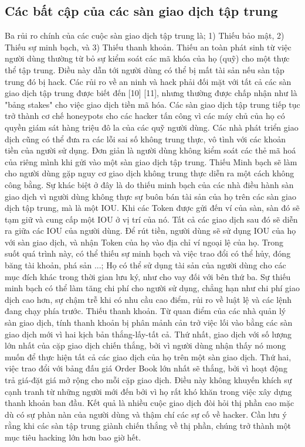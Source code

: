 \documentclass[12pt,a4paper]{article}
\begin{document}
\begin{multicols}{2}
\subsection{Các bất cập của các sàn giao dịch tập trung}
Ba rủi ro chính của các cuộc sàn giao dịch tập trung là; 1) Thiếu bảo mật, 2) Thiếu sự minh bạch, và 3) Thiếu thanh khoản.
Thiếu an toàn phát sinh từ việc người dùng thường từ bỏ sự kiểm soát các mã khóa của họ (quỹ) cho một thực thể tập trung. Điều này dẫn tới người dùng có thể bị mất tài sản nếu sàn tập trung đó bị hack. Các rủi ro về an ninh và hack phải đối mặt với tất cả các sàn giao dịch tập trung được biết đến [10] [11], nhưng thường được chấp nhận như là "bảng stakes" cho việc giao dịch tiền mã hóa. Các sàn giao dịch tập trung tiếp tục trở thành cơ chế honeypots cho các hacker tấn công vì các máy chủ của họ có quyền giám sát hàng triệu đô la của các quỹ người dùng. Các nhà phát triển giao dịch cũng có thể đưa ra các lỗi sai số không trung thực, vô tình với các khoản tiền của người sử dụng. Đơn giản là người dùng không kiểm soát các thẻ mã hoá của riêng mình khi gửi vào một sàn giao dịch tập trung.
Thiếu Minh bạch sẽ làm cho người dùng gặp nguy cơ giao dịch không trung thực diễn ra một cách không công bằng. Sự khác biệt ở đây là do thiếu minh bạch của các nhà điều hành sàn giao dịch vì người dùng không thực sự buôn bán tài sản của họ trên các sàn giao dịch tập trung, mà là một IOU. Khi các Token được gửi đến ví của sàn, sàn đó sẽ tạm giữ và cung cấp một IOU ở vị trí của nó. Tất cả các giao dịch sau đó sẽ diễn ra giữa các IOU của người dùng. Để rút tiền, người dùng sẽ sử dụng IOU của họ với sàn giao dịch, và nhận Token của họ vào địa chỉ ví ngoại lệ của họ. Trong suốt quá trình này, có thể thiếu sự minh bạch và việc trao đổi có thể hủy, đóng băng tài khoản, phá sản ...; Họ có thể sử dụng tài sản của người dùng cho các mục đích khác trong thời gian lưu ký, như cho vay đối với bên thứ ba. Sự thiếu minh bạch có thể làm tăng chi phí cho người sử dụng, chẳng hạn như chi phí giao dịch cao hơn, sự chậm trễ khi có nhu cầu cao điểm, rủi ro về luật lệ và các lệnh đang chạy phía trước.
Thiếu thanh khoản. Từ quan điểm của các nhà quản lý sàn giao dịch, tính thanh khoản bị phân mảnh cản trở việc lối vào bằng các sàn giao dịch mới vì hai kịch bản thắng-lấy-tất cả. Thứ nhất, giao dịch với số lượng lớn nhất của cặp giao dịch chiến thắng, bởi vì người dùng nhận thấy nó mong muốn để thực hiện tất cả các giao dịch của họ trên một sàn giao dịch. Thứ hai, việc trao đổi với bảng đấu giá Order Book lớn nhất sẽ thắng, bởi vì hoạt động trả giá-đặt giá mở rộng cho mỗi cặp giao dịch. Điều này không khuyến khích sự cạnh tranh từ những người mới đến bởi vì họ rất khó khăn trong việc xây dựng thanh khoản ban đầu. Kết quả là nhiều cuộc giao dịch đòi hỏi thị phần cao mặc dù có sự phàn nàn của người dùng và thậm chí các sự cố về hacker. Cần lưu ý rằng khi các sàn tập trung giành chiến thắng về thị phần, chúng trở thành một mục tiêu hacking lớn hơn bao giờ hết.

\end{multicols}
\end{document}
